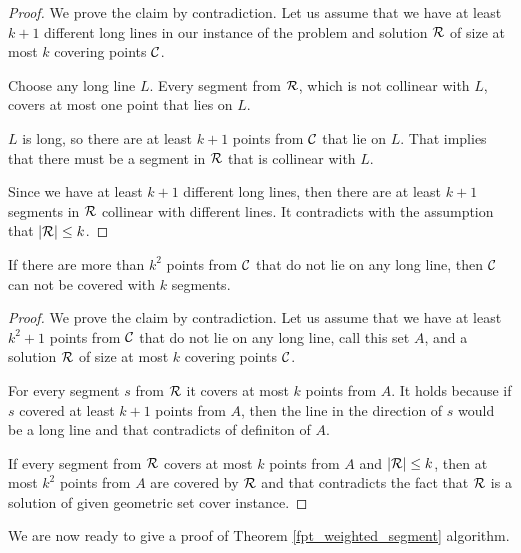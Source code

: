\begin{proof}
We prove the claim by contradiction.
Let us assume that we have at least $k+1$ different
long lines in our instance of the problem
and solution $\mathcal{R}$ of size at most $k$
covering points $\mathcal{C}$.

Choose any long line $L$.
Every segment from $\mathcal{R}$, which is not collinear with $L$,
covers at most one point that lies on $L$.

$L$ is long, so there are at least $k+1$ points from $\mathcal{C}$ that lie on $L$.
That implies that there must be a segment in $\mathcal{R}$ that is
collinear with $L$.

Since we have at least $k+1$ different long lines,
then there are at least $k+1$
segments in $\mathcal{R}$ collinear with different lines.
It contradicts with the assumption that $|\mathcal{R}| \le k$.
\end{proof}

\begin{claim}
\label{few_points}
If there are more than $k^2$ points from $\mathcal{C}$
that do not lie on any long line,
then $\mathcal{C}$ can not be covered with $k$ segments.
\end{claim}

\begin{proof}
We prove the claim by contradiction.
Let us assume that we have at least $k^2+1$ points
from $\mathcal{C}$ that do not lie on any long line, call this set $A$,
and a solution $\mathcal{R}$ of size at most $k$ covering points $\mathcal{C}$.

For every segment $s$ from $\mathcal{R}$ it covers at most $k$
points from $A$.
It holds because if $s$ covered at least $k+1$ points from $A$,
then the line in the direction of $s$ would be a long line
and that contradicts of definiton of $A$.

If every segment from $\mathcal{R}$ covers at most $k$ points from $A$
and $|\mathcal{R}| \le k$, then at most $k^2$ points from $A$ are covered by $\mathcal{R}$
and that contradicts the fact that $\mathcal{R}$ is a solution of given
geometric set cover instance.
\end{proof}

We are now ready to give a proof of Theorem \ref{fpt_weighted_segment}
algorithm.

